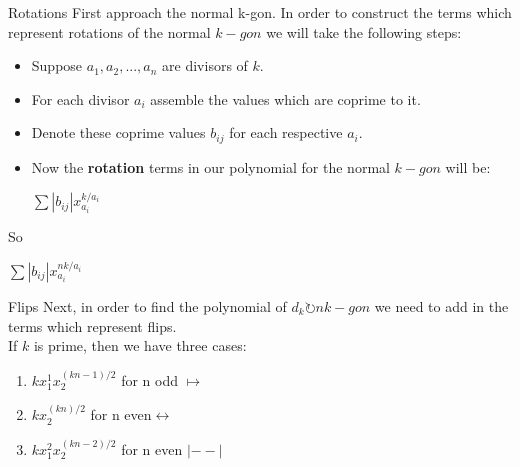 \documentclass{beamer}
\begin{document}
\begin{frame}{Rotations}
    First approach the normal k-gon. In order to construct the terms which represent rotations of the normal $k-gon$ we will take the following steps:\\
\end{frame}
\begin{frame}
	\begin{itemize}
		\item	Suppose $a_1,a_2,...,a_n$ are divisors of $k$.\\
 		\item For each divisor $a_i$ assemble the values which are coprime to it. \\
		\item Denote these coprime values $b_{ij}$ for each respective $a_i$.\\
		\item Now the \textbf{rotation} terms in our polynomial for the normal $k-gon$ will be:\\
		\begin{center}
        $\sum |b_{ij}|x^{k/a_i}_{a_i}$
        \end{center}
	\end{itemize}
\end{frame}
\begin{frame}{}
So
\begin{center}
        $\sum |b_{ij}|x^{nk/a_i}_{a_i}$
        \end{center}
\end{frame}

\begin{frame}{Flips}
 Next, in order to find the polynomial of $d_k \circlearrowright nk-gon$ we need to add in the terms which represent flips.\\
	If $k$ is prime, then we have three cases:
			\begin{enumerate}
				\item $ kx_1^1x_2^{(kn-1)/2}$  for n odd $\longmapsto$\\
				\item $kx_2^{(kn)/2}$ for n even$\longleftrightarrow$\\
                \item $kx_1^2 x_2^{(kn-2)/2}$ for n even $|--|$\\
			\end{enumerate}

\end{frame}
\end{document}
